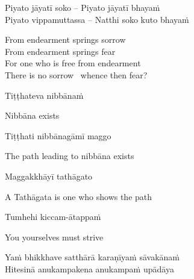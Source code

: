 \suttaRef{[Snp 333-336]}

\begin{twochants}
  Piyato jāyatī soko – Piyato jāyatī bhayaṁ\\
  Piyato vippamuttassa – Natthi soko kuto bhayaṁ\\
\end{twochants}

\begin{english}
  From endearment springs sorrow\\
  From endearment springs fear\\
  For one who is free from endearment\\
  There is no sorrow \breathmark\ whence then fear?
\end{english}

\suttaRef{[Dhp 212]}

\begin{twochants}
  Tiṭṭhateva nibbānaṁ
\end{twochants}

\begin{english}
  Nibbāna exists
\end{english}

\begin{twochants}
  Tiṭṭhati nibbānagāmī maggo
\end{twochants}

\begin{english}
  The path leading to nibbāna exists
\end{english}

\begin{twochants}
  Maggakkhāyī tathāgato
\end{twochants}

\begin{english}
  A Tathāgata is one who shows the path
\end{english}

\suttaRef{[MN 107]}

\begin{twochants}
  Tumhehi kiccam-ātappaṁ
\end{twochants}

\begin{english}
  You yourselves must strive
\end{english}

\suttaRef{[Dhp 276]}

\begin{twochants}
  Yaṁ bhikkhave satthārā karaṇīyaṁ sāvakānaṁ\\
  Hitesinā anukampakena anukampaṁ upādāya\\
\end{twochants}

